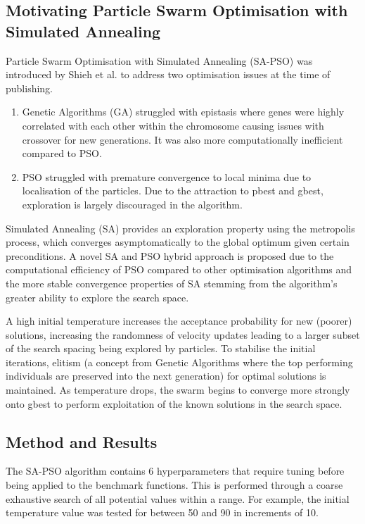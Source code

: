 \documentclass[a4paper, 12pt]{extarticle}
\begin{document}
\subsection{Motivating Particle Swarm Optimisation with Simulated Annealing}

Particle Swarm Optimisation with Simulated Annealing (SA-PSO) was introduced by Shieh et al. \cite{shieh2011modified} to address two optimisation issues at the time of publishing.

\begin{enumerate}
    \item Genetic Algorithms (GA) struggled with epistasis where genes were highly correlated with each other within the chromosome causing issues with crossover for new generations. It was also more computationally inefficient compared to PSO.
    \item PSO struggled with premature convergence to local minima due to localisation of the particles. Due to the attraction to pbest and gbest, exploration is largely discouraged in the algorithm.
\end{enumerate}

Simulated Annealing (SA) provides an exploration property using the metropolis process, which converges asymptomatically to the global optimum given certain preconditions. A novel SA and PSO hybrid approach is proposed due to the computational efficiency of PSO compared to other optimisation algorithms and the more stable convergence properties of SA stemming from the algorithm’s greater ability to explore the search space.

A high initial temperature increases the acceptance probability for new (poorer) solutions, increasing the randomness of velocity updates leading to a larger subset of the search spacing being explored by particles. To stabilise the initial iterations, elitism (a concept from Genetic Algorithms where the top performing individuals are preserved into the next generation) for optimal solutions is maintained. As temperature drops, the swarm begins to converge more strongly onto gbest to perform exploitation of the known solutions in the search space.

\subsection{Method and Results}

The SA-PSO algorithm contains 6 hyperparameters that require tuning before being applied to the benchmark functions. This is performed through a coarse exhaustive search of all potential values within a range. For example, the initial temperature value was tested for between 50 and 90 in increments of 10.
\end{document}

